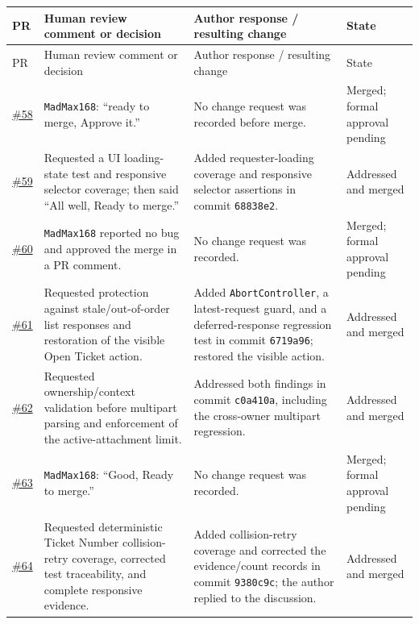 \documentclass[10pt,a4paper]{article}
\begin{document}
{\scriptsize
\begin{longtable}{@{}p{13mm}p{52mm}p{65mm}p{25mm}@{}}
  \toprule
  PR & Human review comment or decision & Author response / resulting change & State \\
  \midrule
  \endfirsthead
  \toprule
  PR & Human review comment or decision & Author response / resulting change & State \\
  \midrule
  \endhead
  \href{https://github.com/ovenmakemeheat/toktickit/pull/58}{\#58} & \texttt{MadMax168}: ``ready to merge, Approve it.'' & No change request was recorded before merge. & Merged; formal approval pending \\
  \href{https://github.com/ovenmakemeheat/toktickit/pull/59}{\#59} & Requested a UI loading-state test and responsive selector coverage; then said ``All well, Ready to merge.'' & Added requester-loading coverage and responsive selector assertions in commit \texttt{68838e2}. & Addressed and merged \\
  \href{https://github.com/ovenmakemeheat/toktickit/pull/60}{\#60} & \texttt{MadMax168} reported no bug and approved the merge in a PR comment. & No change request was recorded. & Merged; formal approval pending \\
  \href{https://github.com/ovenmakemeheat/toktickit/pull/61}{\#61} & Requested protection against stale/out-of-order list responses and restoration of the visible Open Ticket action. & Added \texttt{AbortController}, a latest-request guard, and a deferred-response regression test in commit \texttt{6719a96}; restored the visible action. & Addressed and merged \\
  \href{https://github.com/ovenmakemeheat/toktickit/pull/62}{\#62} & Requested ownership/context validation before multipart parsing and enforcement of the active-attachment limit. & Addressed both findings in commit \texttt{c0a410a}, including the cross-owner multipart regression. & Addressed and merged \\
  \href{https://github.com/ovenmakemeheat/toktickit/pull/63}{\#63} & \texttt{MadMax168}: ``Good, Ready to merge.'' & No change request was recorded. & Merged; formal approval pending \\
  \href{https://github.com/ovenmakemeheat/toktickit/pull/64}{\#64} & Requested deterministic Ticket Number collision-retry coverage, corrected test traceability, and complete responsive evidence. & Added collision-retry coverage and corrected the evidence/count records in commit \texttt{9380c9c}; the author replied to the discussion. & Addressed and merged \\
  \bottomrule
\end{longtable}
}
\end{document}
